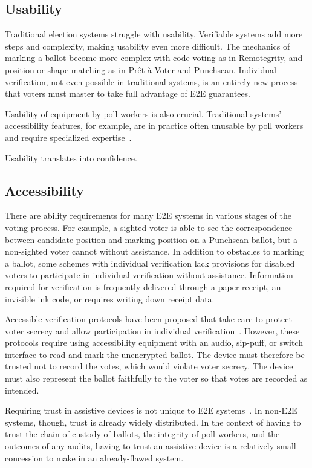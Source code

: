\subsection{Usability}


Traditional election systems struggle with usability. Verifiable
systems add more steps and complexity, making usability even more
difficult. The mechanics of marking a ballot become more complex with
code voting as in Remotegrity, and position or shape matching as in
Prêt à Voter and Punchscan. Individual verification, not even possible
in traditional systems, is an entirely new process that voters must
master to take full advantage of E2E guarantees.

Usability of equipment by poll workers is also crucial. Traditional
systems' accessibility features, for example, are in practice often
unusable by poll workers and require specialized
expertise~\cite{runyan2007improving}.

Usability translates into confidence.

\subsection{Accessibility}

There are ability requirements for many E2E systems in various stages
of the voting process. For example, a sighted voter is able to see the
correspondence between candidate position and marking position on a
Punchscan ballot, but a non-sighted voter cannot without
assistance. In addition to obstacles to marking a ballot, some schemes with
individual verification lack provisions for disabled voters to
participate in individual verification without assistance. Information
required for verification is frequently delivered through a paper
receipt, an invisible ink code, or requires writing down receipt
data.

Accessible verification protocols have been proposed that take care to
protect voter secrecy and allow participation in individual
verification~\cite{chaum2009accessible}. However, these protocols
require using accessibility equipment with an audio, sip-puff, or
switch interface to read and mark the unencrypted ballot. The device
must therefore be trusted not to record the votes, which would violate
voter secrecy. The device must also represent the ballot faithfully to
the voter so that votes are recorded as intended.

Requiring trust in assistive devices is not unique to E2E
systems~\cite{runyan2007improving}. In non-E2E systems, though, trust
is already widely distributed. In the context of having to trust the
chain of custody of ballots, the integrity of poll workers, and the
outcomes of any audits, having to trust an assistive device is a
relatively small concession to make in an already-flawed system.

